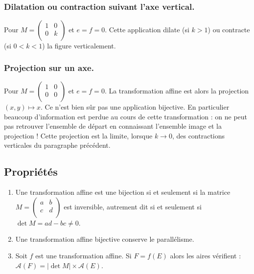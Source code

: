 \documentclass[11pt,class=report,crop=false]{standalone}
\newcommand{\commentfigure}[1]{#1} %
\begin{document}


\subsubsection*{Dilatation ou contraction suivant l'axe vertical.}
Pour $M=\left(\begin{smallmatrix} 1 & 0 \\ 0 & k \\ 
                   \end{smallmatrix} \right)$ 
et $e=f=0$. Cette application dilate (si $k > 1$) ou contracte (si $0<k<1$)
la figure verticalement.


\subsubsection*{Projection sur un axe.}

Pour $M=\left(\begin{smallmatrix} 1 & 0 \\ 0 & 0 \\ 
                   \end{smallmatrix} \right)$ 
et $e=f=0$. La transformation affine est alors la projection $(x,y) \mapsto x$.
Ce n'est bien sûr pas une application bijective. En particulier beaucoup 
d'information est perdue au cours de cette transformation : on ne peut pas retrouver
l'ensemble de départ en connaissant l'ensemble image et la projection !
Cette projection est la limite, lorsque $k\to 0$, des contractions verticales du paragraphe précédent.



\subsection{Propriétés}

\begin{proposition}
\sauteligne
\begin{enumerate}
  \item Une transformation affine est une bijection si et seulement si 
la matrice $M=\left(\begin{smallmatrix} a & b \\ c & d \\ 
                   \end{smallmatrix} \right)$ est inversible, autrement dit 
si et seulement si $\det M = ad-bc \neq 0$.
  
  \item Une transformation affine bijective conserve le parallélisme.

  \item Soit $f$ est une transformation affine. Si $F= f(E)$ alors les aires vérifient :
$\mathcal{A}(F) = |\det M| \times \mathcal{A}(E)$.
\end{enumerate}
\end{proposition}
\end{document}
